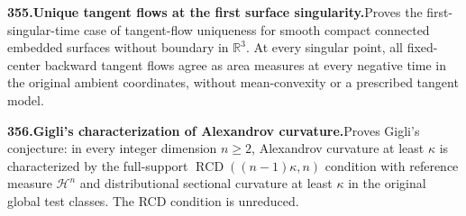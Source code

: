 \documentclass[11pt,a4paper]{article}
\begin{document}
  \par \begin{minipage}{\linewidth}
  \fontsize{10.5}{12.6}\selectfont\RaggedRight
  \hypertarget{result 355}{}
  {\bfseries\textcolor{muted}{355.}\enspace Unique tangent flows at the first surface singularity.}\enspace Proves the first-singular-time case of tangent-flow uniqueness for smooth compact connected embedded surfaces without boundary in $\mathbb R^3$. At every singular point, all fixed-center backward tangent flows agree as area measures at every negative time in the original ambient coordinates, without mean-convexity or a prescribed tangent model.\par
  \end{minipage}\par\vspace{5pt}



  \par \begin{minipage}{\linewidth}
  \fontsize{10.5}{12.6}\selectfont\RaggedRight
  \hypertarget{result 356}{}
  {\bfseries\textcolor{muted}{356.}\enspace Gigli's characterization of Alexandrov curvature.}\enspace Proves Gigli's conjecture: in every integer dimension $n\ge2$, Alexandrov curvature at least $\kappa$ is characterized by the full-support $\operatorname{RCD}((n-1)\kappa,n)$ condition with reference measure $\mathcal H^n$ and distributional sectional curvature at least $\kappa$ in the original global test classes. The RCD condition is unreduced.\par
  \end{minipage}\par\vspace{5pt}
\end{document}
